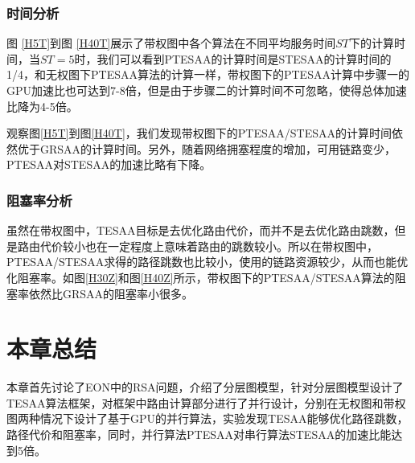 \subsubsection{时间分析}
图 \ref{H5T}到图 \ref{H40T}展示了带权图中各个算法在不同平均服务时间$ST$下的计算时间，当$ST=5$时，我们可以看到PTESAA的计算时间是STESAA的计算时间的1/4，和无权图下PTESAA算法的计算一样，带权图下的PTESAA计算中步骤一的GPU加速比也可达到7-8倍，但是由于步骤二的计算时间不可忽略，使得总体加速比降为4-5倍。

观察图\ref{H5T}到图\ref{H40T}，我们发现带权图下的PTESAA/STESAA的计算时间依然优于GRSAA的计算时间。另外，随着网络拥塞程度的增加，可用链路变少，PTESAA对STESAA的加速比略有下降。

\subsubsection{阻塞率分析}
虽然在带权图中，TESAA目标是去优化路由代价，而并不是去优化路由跳数，但是路由代价较小也在一定程度上意味着路由的跳数较小。所以在带权图中，PTESAA/STESAA求得的路径跳数也比较小，使用的链路资源较少，从而也能优化阻塞率。如图\ref{H30Z}和图\ref{H40Z}所示，带权图下的PTESAA/STESAA算法的阻塞率依然比GRSAA的阻塞率小很多。

\section{本章总结}
本章首先讨论了EON中的RSA问题，介绍了分层图模型，针对分层图模型设计了TESAA算法框架，对框架中路由计算部分进行了并行设计，分别在无权图和带权图两种情况下设计了基于GPU的并行算法，实验发现TESAA能够优化路径跳数，路径代价和阻塞率，同时，并行算法PTESAA对串行算法STESAA的加速比能达到5倍。
